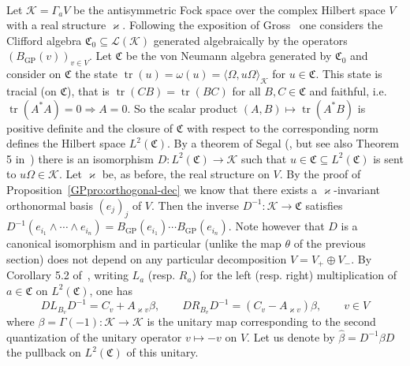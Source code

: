 \documentclass{article}
\newcommand{\tmop}[1]{\ensuremath{\operatorname{#1}}}
\begin{document}
\

Let $\mathcal{K}= \Gamma_a V$ be the antisymmetric Fock space over the
complex Hilbert space $V$ with a real structure $\varkappa$. Following the
exposition of Gross~{\cite{gross_existence_1972}} one considers the Clifford
algebra $\mathfrak{C}_0 \subseteq \mathcal{L} (\mathcal{K})$ generated
algebraically by the operators $(B_{\tmop{GP}} (v))_{v \in V}$. Let
$\mathfrak{C}$ be the von Neumann algebra generated by $\mathfrak{C}_0$ and
consider on $\mathfrak{C}$ the state $\tmop{tr} (u) = \omega (u) = \langle
\Omega, u \Omega \rangle_{\mathcal{K}}$ for $u \in \mathfrak{C}$. This state
is tracial (on $\mathfrak{C}$), that is $\tmop{tr} (C B) = \tmop{tr} (B C)$
for all $B, C \in \mathfrak{C}$ and faithful, i.e. $\tmop{tr} (A^{\ast} A) = 0
\Rightarrow A = 0$. So the scalar product $(A, B) \mapsto \tmop{tr} (A^{\ast}
B)$ is positive definite and the closure of $\mathfrak{C}$ with respect to the
corresponding norm defines the Hilbert space $L^2 (\mathfrak{C})$. By a
theorem of Segal ({\cite{segal_tensor_1956}}, but see also Theorem 5
in~{\cite{gross_existence_1972}}) there is an isomorphism $D : L^2
(\mathfrak{C}) \rightarrow \mathcal{K}$ such that $u \in \mathfrak{C}
\subseteq L^2 (\mathfrak{C})$ is sent to $u \Omega \in \mathcal{K}$. Let
$\varkappa$ be, as before, the real structure on $V$. By the proof of
Proposition~\ref{GPpro:orthogonal-dec} we know that there exists a
$\varkappa$-invariant orthonormal basis $(e_j)_j$ of $V$. Then the inverse
$D^{- 1} : \mathcal{K} \rightarrow \mathfrak{C}$ satisfies $D^{- 1} (e_{i_1}
\wedge \cdots \wedge e_{i_n}) = B_{\tmop{GP}} (e_{i_1}) \cdots B_{\tmop{GP}}
(e_{i_n})$. Note however that $D$ is a canonical isomorphism and in particular
(unlike the map $\theta$ of the previous section) does not depend on any
particular decomposition $V = V_+ \oplus V_-$. By Corollary 5.2
of~{\cite{gross_existence_1972}}, writing $L_a$ (resp. $R_a$) for the left
(resp. right) multiplication of $a \in \mathfrak{C}$ on $L^2 (\mathfrak{C})$,
one has
\begin{equation}
  D L_{B_v} D^{- 1} = C_v + A_{\varkappa v} \beta, \qquad D R_{B_v} D^{- 1} =
  (C_v - A_{\varkappa v}) \beta, \qquad v \in V \label{eq:maps}
\end{equation}
where $\beta = \Gamma (- 1) : \mathcal{K} \rightarrow \mathcal{K}$ is the
unitary map corresponding to the second quantization of the unitary operator
$v \mapsto - v$ on $V$. Let us denote by $\hat{\beta} = D^{- 1} \beta D$ the
pullback on $L^2 (\mathfrak{C})$ of this unitary.
\end{document}
